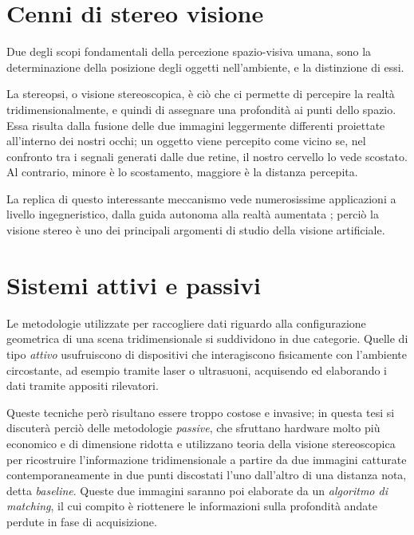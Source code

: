 \documentclass[12pt,a4paper]{report}
\begin{document}
\section{Cenni di stereo visione}

Due degli scopi fondamentali della percezione spazio-visiva umana, sono la
determinazione della posizione degli oggetti nell'ambiente, e la distinzione di
essi.

La stereopsi, o visione stereoscopica, è ciò che ci permette di percepire la
realtà tridimensionalmente, e quindi di assegnare una profondità ai punti dello
spazio.  Essa risulta dalla fusione delle due immagini leggermente differenti
proiettate all'interno dei nostri occhi; un oggetto viene percepito come vicino
se, nel confronto tra i segnali generati dalle due retine, il nostro cervello 
lo vede scostato. Al contrario, minore è lo scostamento, maggiore è la distanza
percepita.

La replica di questo interessante meccanismo vede numerosissime applicazioni a
livello ingegneristico, dalla guida autonoma \cite{goldberg2002stereo}
\cite{broggi2001self} alla realtà aumentata \cite{kanbara2000stereo}; perciò la
visione stereo è uno dei principali argomenti di studio della visione
artificiale.

\section{Sistemi attivi e passivi}

Le metodologie utilizzate per raccogliere dati riguardo alla configurazione
geometrica di una scena tridimensionale si suddividono in due categorie.
Quelle di tipo \textit{attivo} usufruiscono di dispositivi che interagiscono
fisicamente con l'ambiente circostante, ad esempio tramite laser o ultrasuoni,
acquisendo ed elaborando i dati tramite appositi rilevatori.

Queste tecniche però risultano essere troppo costose e invasive; in questa tesi
si discuterà perciò delle metodologie \textit{passive}, che sfruttano hardware
molto più economico e di dimensione ridotta e utilizzano teoria della visione
stereoscopica per ricostruire l'informazione tridimensionale a partire da due
immagini catturate contemporaneamente in due punti discostati l'uno dall'altro
di una distanza nota, detta \textit{baseline}.
Queste due immagini saranno poi elaborate da un \textit{algoritmo di matching},
il cui compito è riottenere le informazioni sulla profondità andate perdute in
fase di acquisizione.
\end{document}
